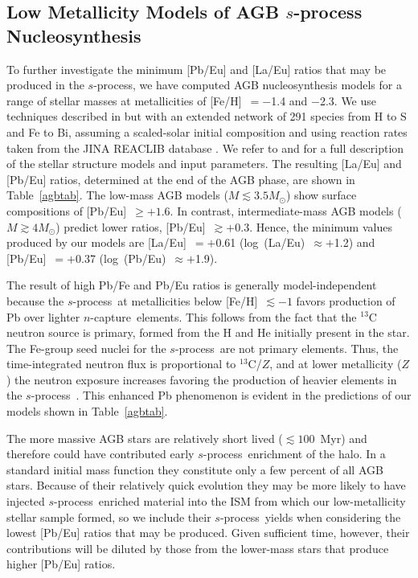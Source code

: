 \documentclass{emulateapj}
\def\spro{\mbox{$s$-process}}
\def\ncap{\mbox{$n$-capture}}
\begin{document}
\subsection{Low Metallicity Models of AGB $s$-process Nucleosynthesis}
\label{pbmodels}


To further investigate the minimum [Pb/Eu] and [La/Eu]
ratios that may be produced in the \spro,
we have computed AGB nucleosynthesis models for a range of 
stellar masses at metallicities of [Fe/H]~$= -$1.4 and $-$2.3.
We use techniques 
described in \citet{karakas09} but with an extended network of 
291 species from H to S and Fe to Bi, assuming a 
scaled-solar initial composition and using reaction rates taken from the 
JINA REACLIB database \citep{cyburt10}.
We refer to \citet{karakas07} and \citet{karakas10} for a full 
description of the stellar structure models and input parameters. 
The resulting [La/Eu] and [Pb/Eu] ratios, determined
at the end of the AGB phase, are shown in Table~\ref{agbtab}.
The low-mass AGB models ($M \lesssim 3.5M_{\odot}$) show surface 
compositions of [Pb/Eu]~$\ge +1.6$. 
In contrast, intermediate-mass AGB models ($M \gtrsim 4M_{\odot}$) 
predict lower ratios, [Pb/Eu]~$\gtrsim +0.3$. 
Hence, the minimum values produced by our models are
[La/Eu]~$= +$0.61 (log~(La/Eu)~$\approx +$1.2) and
[Pb/Eu]~$= +$0.37 (log~(Pb/Eu)~$\approx +$1.9). 

The result of high Pb/Fe and Pb/Eu ratios is generally model-independent
because the \spro\ at metallicities below [Fe/H]~$\lesssim -1$ 
favors production of Pb over lighter \ncap\ elements.
This follows from the fact that the $^{13}$C neutron source is primary,
formed from the H and He initially present in the star.
The Fe-group seed nuclei for the \spro\ are not primary elements.
Thus, the time-integrated neutron flux is proportional to 
$^{13}$C/$Z$, and at lower metallicity ($Z$) the neutron exposure
increases favoring the production of heavier elements in the \spro\
\citep{clayton88,gallino98}.
This enhanced Pb phenomenon
is evident in the predictions of our models shown in Table~\ref{agbtab}.

The more massive AGB stars are relatively short lived 
($\lesssim 100$~Myr) and therefore could have contributed 
early \spro\ enrichment of the halo.
In a standard initial mass function they constitute only a 
few percent of all AGB stars.
Because of their relatively quick evolution they may be
more likely to have injected \spro\ enriched material into the ISM
from which our low-metallicity stellar sample formed,
so we include their \spro\ yields when considering the lowest
[Pb/Eu] ratios that may be produced.
Given sufficient time, however, their contributions will be diluted by
those from the lower-mass stars that produce higher [Pb/Eu] ratios.
\end{document}
